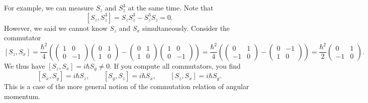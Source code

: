 For example, we can measure $S_z$ and $S_z^3$ at the same time. Note that
\[
	[S_z,S_z^3]=S_zS_z^3-S_z^3S_z=0
.\]
However, we said we cannot know $S_z$ and $S_x$ simultaneously. Consider the commutator
\[
	[S_z,S_x]=\frac{\hbar^2}{4}\left( \begin{pmatrix}
	1 & 0 \\
	0 & -1
	\end{pmatrix}\begin{pmatrix}
	0 & 1 \\
	1 & 0
	\end{pmatrix}-\begin{pmatrix}
	0 & 1 \\
	1 & 0
	\end{pmatrix}\begin{pmatrix}
	1 & 0 \\
	0 & -1
	\end{pmatrix}\right)=\frac{\hbar^2}{4} \left( \begin{pmatrix}
	0 & 1 \\
	-1 & 0
	\end{pmatrix}-\begin{pmatrix}
	0 & -1 \\
	1 & 0
	\end{pmatrix} \right) =\frac{\hbar^2}{2} \begin{pmatrix}
	0 & 1 \\
	-1 & 0
	\end{pmatrix}
.\]
We thus have $\left[ S_z,S_x \right] = i\hbar S_y \neq 0$. If you compute all commutators, you find
\[
	[S_x,S_y]=i\hbar S_z,\qquad [S_y,S_z]=i\hbar S_x,\qquad [S_z,S_x]=i\hbar S_y
.\]
This is a case of the more general notion of the commutation relation of angular momentum.

